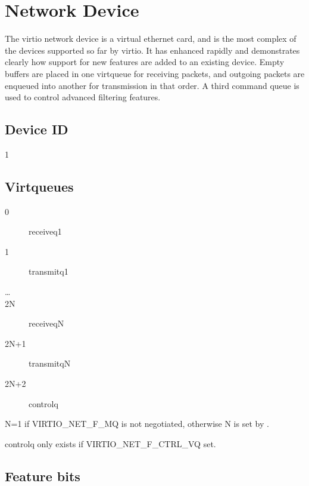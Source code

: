 \section{Network Device}\label{sec:Device Types / Network Device}

The virtio network device is a virtual ethernet card, and is the
most complex of the devices supported so far by virtio. It has
enhanced rapidly and demonstrates clearly how support for new
features are added to an existing device. Empty buffers are
placed in one virtqueue for receiving packets, and outgoing
packets are enqueued into another for transmission in that order.
A third command queue is used to control advanced filtering
features.

\subsection{Device ID}\label{sec:Device Types / Network Device / Device ID}

 1

\subsection{Virtqueues}\label{sec:Device Types / Network Device / Virtqueues}

\begin{description}
\item[0] receiveq1
\item[1] transmitq1
\item[\ldots]
\item[2N] receiveqN
\item[2N+1] transmitqN
\item[2N+2] controlq
\end{description}

 N=1 if VIRTIO_NET_F_MQ is not negotiated, otherwise N is set by
 .

 controlq only exists if VIRTIO_NET_F_CTRL_VQ set.

\subsection{Feature bits}\label{sec:Device Types / Network Device / Feature bits}

